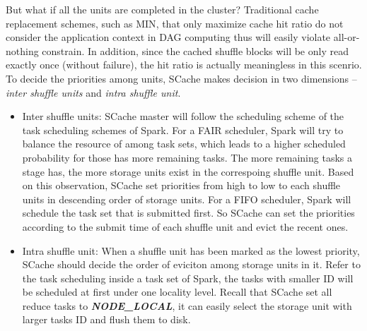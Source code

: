 But what if all the units are completed in the cluster? Traditional cache replacement schemes, such as MIN\cite{min}, that only maximize cache hit ratio do not consider the application context in DAG computing thus will easily violate all-or-nothing constrain. In addition, since the cached shuffle blocks will be only read exactly once (without failure), the hit ratio is actually meaningless in this scenrio. To decide the priorities among units, SCache makes decision in two dimensions -- \textit{inter shuffle units} and \textit{intra shuffle unit}. 
\begin{itemize}[noitemsep]
	\item Inter shuffle units: SCache master will follow the scheduling scheme of the task scheduling schemes of Spark. For a FAIR scheduler, Spark will try to balance the resource of among task sets, which leads to a higher scheduled probability for those has more remaining tasks.  The more remaining tasks a stage has, the more storage units exist in the correspoing shuffle unit. Based on this observation, SCache set priorities from high to low to each shuffle units in descending order of storage units. For a FIFO scheduler, Spark will schedule the task set that is submitted first. So SCache can set the priorities according to the submit time of each shuffle unit and evict the recent ones.
	\item Intra shuffle unit: When a shuffle unit has been marked as the lowest priority, SCache should decide the order of eviciton among storage units in it. Refer to the task scheduling inside a task set of Spark, the tasks with smaller ID will be scheduled at first under one locality level. Recall that SCache set all reduce tasks to \textbf{\textit{NODE\_LOCAL}}, it can easily select the storage unit with larger tasks ID and flush them to disk.
\end{itemize}


